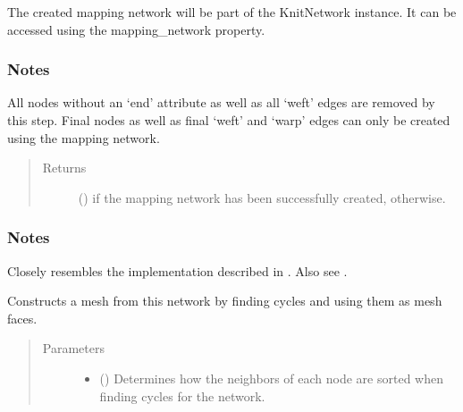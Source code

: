 \documentclass[letterpaper,10pt,english]{sphinxmanual}
\begin{document}
\begin{fulllineitems}
\begin{fulllineitems}
The created mapping network will be part of the KnitNetwork instance.
It can be accessed using the mapping\_network property.
\subsubsection*{Notes}

All nodes without an ‘end’ attribute as well as all ‘weft’ edges are
removed by this step. Final nodes as well as final ‘weft’ and ‘warp’
edges can only be created using the mapping network.
\begin{quote}\begin{description}
\item[{Returns}] \leavevmode
{} () \textendash{}  if the mapping network has been successfully created,
 otherwise.

\end{description}\end{quote}
\subsubsection*{Notes}

Closely resembles the implementation described in  \sphinxfootnotemark[1]. Also see
 \sphinxfootnotemark[2].

\end{fulllineitems}


\begin{fulllineitems}
\label{\detokenize{cockatoo:cockatoo.KnitNetwork.create_mesh}}
Constructs a mesh from this network by finding cycles and using them as
mesh faces.
\begin{quote}\begin{description}
\item[{Parameters}] \leavevmode\begin{itemize}
\item {} 
 (\sphinxstyleliteralemphasis{\sphinxupquote{, }}) \textendash{} 
Determines how the neighbors of each node are sorted when finding
cycles for the network.


\end{itemize}
\end{description}
\end{quote}
\end{fulllineitems}
\end{fulllineitems}
\end{document}
